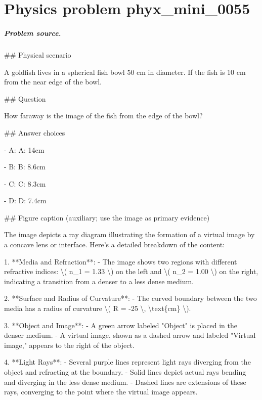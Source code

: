 
\chapter{Physics problem phyx\_mini\_0055}
\label{ch:PhyXMiniProblems_problem_phyx_mini_0055}

\paragraph{Problem source.}
\#\# Physical scenario

A goldfish lives in a spherical fish bowl 50 cm in diameter. If the fish is 10 cm from the near edge of the bowl.

\#\# Question

How faraway is the image of the fish from the edge of the bowl?

\#\# Answer choices

- A: A: 14cm

- B: B: 8.6cm

- C: C: 8.3cm

- D: D: 7.4cm

\#\# Figure caption (auxiliary; use the image as primary evidence)

The image depicts a ray diagram illustrating the formation of a virtual image by a concave lens or interface. Here's a detailed breakdown of the content:

1. **Media and Refraction**:
   - The image shows two regions with different refractive indices: \textbackslash{}( n\_1 = 1.33 \textbackslash{}) on the left and \textbackslash{}( n\_2 = 1.00 \textbackslash{}) on the right, indicating a transition from a denser to a less dense medium.

2. **Surface and Radius of Curvature**:
   - The curved boundary between the two media has a radius of curvature \textbackslash{}( R = -25 \textbackslash{}, \textbackslash{}text\{cm\} \textbackslash{}).

3. **Object and Image**:
   - A green arrow labeled "Object" is placed in the denser medium.
   - A virtual image, shown as a dashed arrow and labeled "Virtual image," appears to the right of the object.

4. **Light Rays**:
   - Several purple lines represent light rays diverging from the object and refracting at the boundary. 
   - Solid lines depict actual rays bending and diverging in the less dense medium.
   - Dashed lines are extensions of these rays, converging to the point where the virtual image appears.

